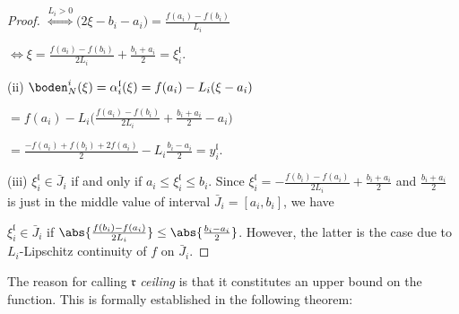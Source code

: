 \begin{lem}
\begin{proof}
$\stackrel{L_i > 0}{\Leftrightarrow}   \bigl( 2 \xi - b_i  - a_i\bigr) = \frac{f(a_i) - f(b_i)}{L_i} $

$\Leftrightarrow   \xi  = \frac{f(a_i) - f(b_i)}{2 L_i}  + \frac{b_i+a_i}{2} = \xi^{\mathfrak l}_i$.

(ii) $\boden_N^i(\xi) = \alpha_i^{\mathfrak l} (\xi) =  f(a_i) - L_i (\xi - a_i) $

$= f(a_i) - L_i \bigl( \frac{f(a_i) - f(b_i)}{2 L_i}  + \frac{b_i+a_i}{2} - a_i \bigr) $ 

$=  \frac{-f(a_i) + f(b_i) + 2f(a_i)}{2 }  - L_i \frac{b_i-a_i}{2}   = y_i^{\mathfrak l}$. 

(iii) $\xi^{\mathfrak l}_i \in \bar J_i$ if and only if $a_i \leq \xi^{\mathfrak l}_i \leq b_i$. Since $\xi^{\mathfrak l}_i = -\frac{f(b_i) - f(a_i)}{2 L_i}  + \frac{b_i+a_i}{2}$ and $\frac{b_i+a_i}{2}$ is just in the middle value of interval $\bar J_i = [a_i,b_i]$, we have 

$\xi^{\mathfrak l}_i \in \bar J_i$ if $\abs{\frac{f(b_i) - f(a_i)}{2 L_i}} \leq \abs{\frac{b_i-a_i}{2}}$.
However, the latter is the case due to $L_i$-Lipschitz continuity of $f$ on $\bar J_i$.  
  
\end{proof}

\end{lem}


The reason for calling $\mathfrak r$ \emph{ceiling} is that it
constitutes an upper bound on the function. This is formally
established in the following theorem:

